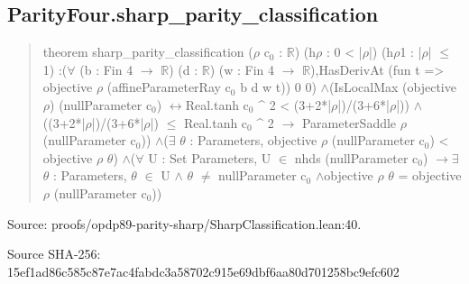 \documentclass[11pt,a4paper]{article}
\begin{document}
\begin{samepage}
\subsection{ParityFour.sharp\_parity\_classification}
\begin{quote}\small\ttfamily theorem sharp\_parity\_classification (\ensuremath{\rho} c\ensuremath{_0} : \ensuremath{\mathbb{R}}) (h\ensuremath{\rho} : 0 < |\ensuremath{\rho}|) (h\ensuremath{\rho}1 : |\ensuremath{\rho}| \ensuremath{\leq} 1) :\newline     (\ensuremath{\forall} (b : Fin 4 \ensuremath{\to} \ensuremath{\mathbb{R}}) (d : \ensuremath{\mathbb{R}}) (w : Fin 4 \ensuremath{\to} \ensuremath{\mathbb{R}}),\newline       HasDerivAt (fun t => objective \ensuremath{\rho} (affineParameterRay c\ensuremath{_0} b d w t)) 0 0) \ensuremath{\wedge}\newline     (IsLocalMax (objective \ensuremath{\rho}) (nullParameter c\ensuremath{_0}) \ensuremath{\leftrightarrow}\newline       Real.tanh c\ensuremath{_0} \textasciicircum{} 2 < (3+2*|\ensuremath{\rho}|)/(3+6*|\ensuremath{\rho}|)) \ensuremath{\wedge}\newline     ((3+2*|\ensuremath{\rho}|)/(3+6*|\ensuremath{\rho}|) \ensuremath{\leq} Real.tanh c\ensuremath{_0} \textasciicircum{} 2 \ensuremath{\to} ParameterSaddle \ensuremath{\rho} (nullParameter c\ensuremath{_0})) \ensuremath{\wedge}\newline     (\ensuremath{\exists} \ensuremath{\theta} : Parameters, objective \ensuremath{\rho} (nullParameter c\ensuremath{_0}) < objective \ensuremath{\rho} \ensuremath{\theta}) \ensuremath{\wedge}\newline     (\ensuremath{\forall} U : Set Parameters, U \ensuremath{\in} nhds (nullParameter c\ensuremath{_0}) \ensuremath{\to}\newline       \ensuremath{\exists} \ensuremath{\theta} : Parameters, \ensuremath{\theta} \ensuremath{\in} U \ensuremath{\wedge} \ensuremath{\theta} \ensuremath{\neq} nullParameter c\ensuremath{_0} \ensuremath{\wedge}\newline         objective \ensuremath{\rho} \ensuremath{\theta} = objective \ensuremath{\rho} (nullParameter c\ensuremath{_0}))\end{quote}
{\small Source: proofs/opdp89-parity-sharp/SharpClassification.lean:40.\par}

{\small Source SHA-256: 15ef1ad86c585c87e7ac4fabdc3a58702c915e69dbf6aa80d701258bc9efc602\par}

\end{samepage}
\end{document}
